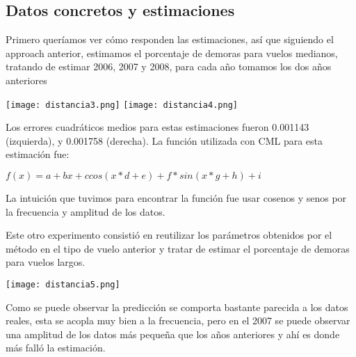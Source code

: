 \subsection{Datos concretos y estimaciones}

Primero queríamos ver cómo responden las estimaciones, así que siguiendo el approach anterior, estimamos el porcentaje de demoras para vuelos medianos, tratando de estimar 2006, 2007 y 2008, para cada año tomamos los dos años anteriores

\texttt{[image: distancia3.png]}
\texttt{[image: distancia4.png]}

Los errores cuadráticos medios para estas estimaciones fueron 0.001143 (izquierda), y 0.001758 (derecha). La función utilizada con CML para esta estimación fue:

\bigskip

$f(x) = a + bx +c cos(x*d+e) + f * sin(x*g+h) + i$

La intuición que tuvimos para encontrar la función fue usar cosenos y senos por la frecuencia y amplitud de los datos.

Este otro experimento consistió en reutilizar los parámetros obtenidos por el método en el tipo de vuelo anterior y tratar de estimar el porcentaje de demoras para vuelos largos. 

\texttt{[image: distancia5.png]}

Como se puede observar la predicción se comporta bastante parecida a los datos reales, esta se acopla muy bien a la frecuencia, pero en el 2007 se puede observar una amplitud de los datos más pequeña que los años anteriores y ahí es donde más falló la estimación.